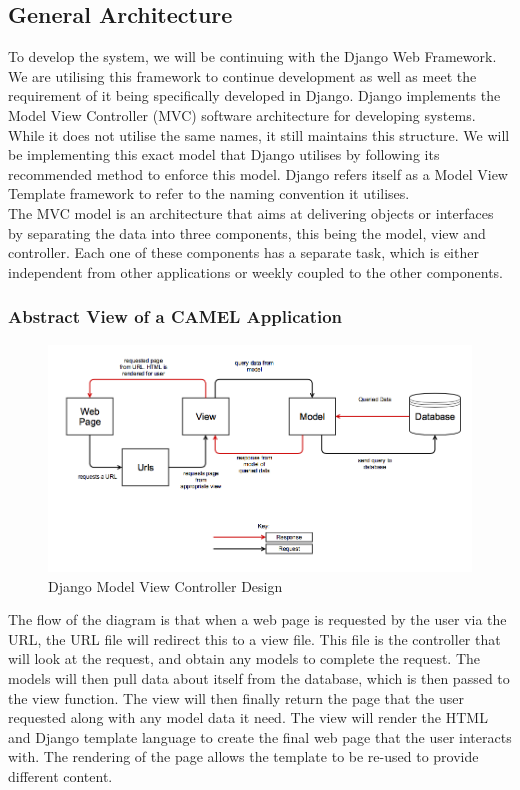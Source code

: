\subsection{General Architecture}
	To develop the system, we will be continuing with the Django Web Framework. We are utilising this framework to continue development as well as meet the requirement of it being specifically developed in Django. Django implements the Model View Controller (MVC) software architecture for developing systems. While it does not utilise the same names, it still maintains this structure. We will be implementing this exact model that Django utilises by following its recommended method to enforce this model. Django refers itself as a Model View Template framework to refer to the naming convention it utilises.\\
		
		\noindent The MVC model is an architecture that aims at delivering objects or interfaces by separating the data into three components, this being the model, view and controller. Each one of these components has a separate task, which is either independent from other applications or weekly coupled to the other components.\\
		
		\subsubsection{Abstract View of  a CAMEL Application}	
		\begin{figure}[h]
			\includegraphics[scale=0.40]{softwarearchitecture/img/caml_mvc_abstract_diagram}
			\caption{Django Model View Controller Design}
		\end{figure}
		
		The flow of the diagram is that when a web page is requested by the user via the URL, the URL file will redirect this to a view file. This file is the controller that will look at the request, and obtain any models to complete the request. The models will then pull data about itself from the database, which is then passed to the view function. The view will then finally return the page that the user requested along with any model data it need. The view will render the HTML and Django template language to create the final web page that the user interacts with. The rendering of the page allows the template to be re-used to provide different content.\\ 		
		
